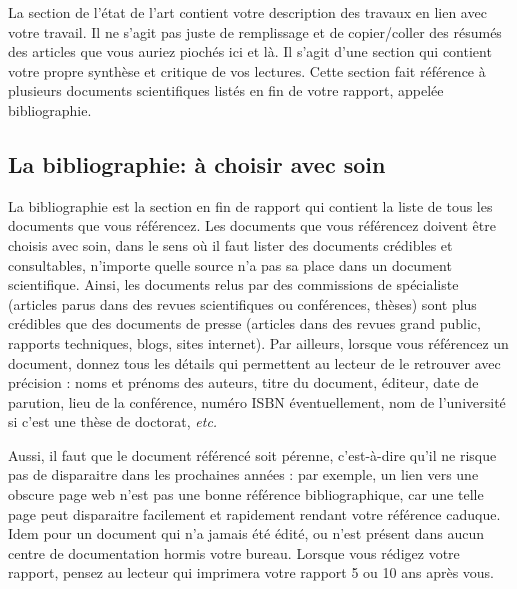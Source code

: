 \documentclass{rapport}
\def\etc{\textit{etc.}\xspace}
\begin{document}
        La section de l'état de l'art contient votre description des travaux en lien avec votre travail. Il ne s'agit pas juste de remplissage et de copier/coller des résumés des articles que vous auriez piochés ici et là. Il s'agit d'une section qui contient votre propre synthèse et critique de vos lectures. Cette section fait référence à plusieurs documents scientifiques listés en fin de votre rapport, appelée bibliographie. 

      \subsection{La bibliographie: à choisir avec soin} 
        La bibliographie est la section en fin de rapport qui contient la liste de tous les documents que vous référencez. Les documents que vous référencez doivent être choisis avec soin, dans le sens où il faut lister des documents crédibles et consultables, n'importe quelle source n'a pas sa place dans un document scientifique. Ainsi, les documents relus par des commissions de spécialiste (articles parus dans des revues scientifiques ou conférences, thèses) sont plus crédibles que des documents de presse (articles dans des revues grand public, rapports techniques, blogs, sites internet). Par ailleurs, lorsque vous référencez un document, donnez tous les détails qui permettent au lecteur de le retrouver avec précision : noms et prénoms des auteurs, titre du document, éditeur, date de parution, lieu de la conférence, numéro ISBN éventuellement, nom de l'université si c'est une thèse de doctorat, \etc 
        
        Aussi, il faut que le document référencé soit pérenne, c'est-à-dire qu'il ne risque pas de disparaitre dans les prochaines années : par exemple, un lien vers une obscure page web n'est pas une bonne référence bibliographique, car une telle page peut disparaitre facilement et rapidement rendant votre référence caduque. Idem pour un document qui n'a jamais été édité, ou n'est présent dans aucun centre de documentation hormis votre bureau. Lorsque vous rédigez votre rapport, pensez au lecteur qui imprimera votre rapport  5 ou 10 ans après vous. 
 
\end{document}
